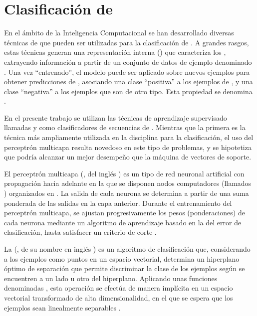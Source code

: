 %
%
%
\section{Clasificación de }
%
En el ámbito de la Inteligencia Computacional se han desarrollado
diversas técnicas de  que pueden ser
utilizadas para la clasificación de .
A grandes rasgos, estas técnicas generan una representación interna
() que caracteriza los , extrayendo información
a partir de un conjunto de datos de ejemplo denominado .
Una vez ``entrenado'', el modelo puede ser aplicado sobre nuevos
ejemplos para obtener predicciones de , asociando una clase
``positiva'' a los ejemplos de , y una clase ``negativa''
a los ejemplos que son de otro tipo.
Esta propiedad se denomina .

En el presente trabajo se utilizan las técnicas de aprendizaje
supervisado llamadas \e\MVS{} \cite{svm} y 
\cite{mlp1,mlp2} como clasificadores de secuencias de .
Mientras que la primera es la técnica más ampliamente utilizada en
la disciplina para la clasificación, el uso del perceptrón multicapa
resulta novedoso en este tipo de problemas, y se hipotetiza que podría
alcanzar un mejor desempeño que la máquina de vectores de soporte.

El perceptrón multicapa (, del inglés ) es un tipo de red neuronal artificial con propagación
hacia adelante en la que se disponen nodos computadores (llamados
) organizados en .
La salida de cada neurona se determina a partir de una suma ponderada
de las salidas en la capa anterior.
Durante el entrenamiento del perceptrón multicapa, se ajustan
progresivamente los pesos (ponderaciones) de cada neurona mediante un
algoritmo de aprendizaje basado en la  del
error de clasificación, hasta satisfacer un criterio de corte
\cite{jain}.

La \MVS{} (, de su nombre en inglés ) es un algoritmo de clasificación que, considerando a los
ejemplos como puntos en un espacio vectorial, determina un hiperplano
óptimo de separación que permite discriminar la clase de los ejemplos
según se encuentren a un lado u otro del hiperplano.
Aplicando unas funciones denominadas , esta operación se
efectúa de manera implícita en un espacio vectorial transformado de
alta dimensionalidad, en el que se espera que los ejemplos sean
linealmente separables \cite{bottou}.
